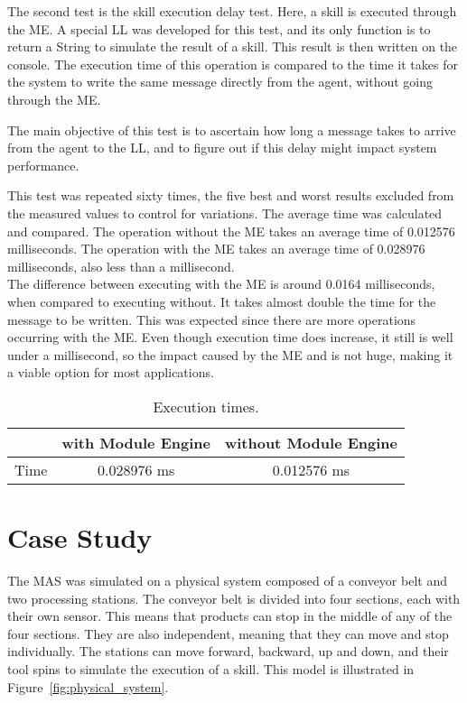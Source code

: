 The second test is the skill execution delay test. Here, a skill is executed through the \acrlong{ME}. A special \acrlong{LL} was developed for this test, and its only function is to return a String to simulate the result of a skill. This result is then written on the console. The execution time of this operation is compared to the time it takes for the system to write the same message directly from the agent, without going through the \acrshort{ME}.

The main objective of this test is to ascertain how long a message takes to arrive from the agent to the \acrlong{LL}, and to figure out if this delay might impact system performance.

This test was repeated sixty times, the five best and worst results excluded from the measured values to control for variations. The average time was calculated and compared. The operation without the \acrshort{ME} takes an average time of 0.012576 milliseconds. The operation with the \acrshort{ME} takes an average time of 0.028976 milliseconds, also less than a millisecond.\\

The difference between executing with the \acrshort{ME} is around 0.0164 milliseconds, when compared to executing without. It takes almost double the time for the message to be written. This was expected since there are more operations occurring with the \acrshort{ME}. Even though execution time does increase, it still is well under a millisecond, so the impact caused by the \acrlong{ME} and  is not huge, making it a viable option for most applications.

\begin{table}[h!]
	\centering
	\caption{Execution times.}
	\begin{tabular}{l|c|c|}
		\cline{2-3}
									& with Module Engine & without Module Engine \\ \hline
		\multicolumn{1}{|l|}{Time} 	& 0.028976 ms           & 0.012576 ms              \\ \hline
	\end{tabular}
	\label{tab:execution_times}
\end{table}

\section{Case Study}

The \acrshort{MAS} was simulated on a physical system composed of a conveyor belt and two processing stations. The conveyor belt is divided into four sections, each with their own sensor. This means that products can stop in the middle of any of the four sections. They are also independent, meaning that they can move and stop individually. The stations can move forward, backward, up and down, and their tool spins to simulate the execution of a skill. This model is illustrated in Figure~\ref{fig:physical_system}.

